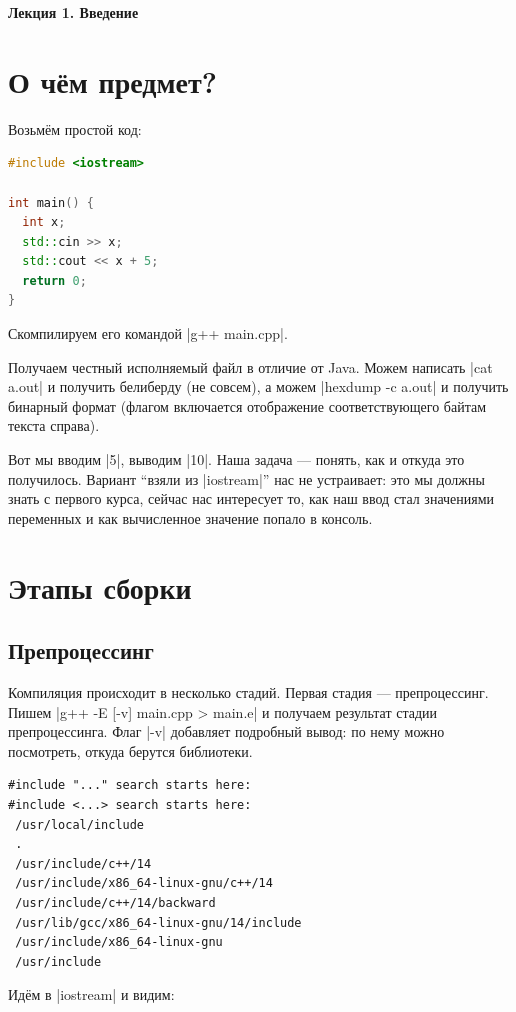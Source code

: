 \documentclass[11pt]{article}
\begin{document}
{\Huge\bfseries Лекция 1. Введение\par}

\vspace{2em}

\section{О чём предмет?}

Возьмём простой код:
\begin{lstlisting}[language=C++]
#include <iostream>

int main() {
  int x;
  std::cin >> x;
  std::cout << x + 5;
  return 0;
}
\end{lstlisting}
Скомпилируем его командой \nolint|g++ main.cpp|.

Получаем честный исполняемый файл в отличие от Java. Можем написать
\nolint|cat a.out| и получить белиберду (не совсем), а можем
\nolint|hexdump -c a.out| и получить бинарный формат (флагом включается отображение соответствующего байтам текста справа).

Вот мы вводим \nolint|5|, выводим \nolint|10|. Наша задача --- понять,
как и откуда это получилось. Вариант ``взяли из \nolint|iostream|'' нас
не устраивает: это мы должны знать с первого курса, сейчас нас интересует то, как наш ввод стал значениями переменных и как вычисленное значение попало в консоль.

\section{Этапы сборки}
\subsection{Препроцессинг}

Компиляция происходит в несколько стадий. Первая стадия --- препроцессинг.
Пишем \nolint|g++ -E [-v] main.cpp > main.e| и получаем результат стадии
препроцессинга. Флаг \nolint|-v| добавляет подробный вывод: по нему можно
посмотреть, откуда берутся библиотеки.

\begin{lstlisting}
#include "..." search starts here:
#include <...> search starts here:
 /usr/local/include
 .
 /usr/include/c++/14
 /usr/include/x86_64-linux-gnu/c++/14
 /usr/include/c++/14/backward
 /usr/lib/gcc/x86_64-linux-gnu/14/include
 /usr/include/x86_64-linux-gnu
 /usr/include
\end{lstlisting}

Идём в \nolint|iostream| и видим:
\end{document}
